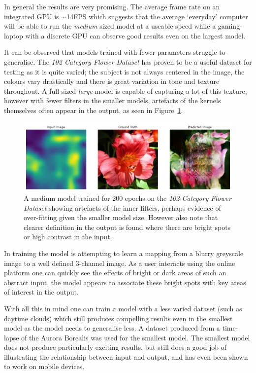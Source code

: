 \documentclass{article}
\begin{document}
In general the results are very promising. The average frame rate on an integrated GPU is $\sim$14FPS which suggests that the average `everyday' computer will be able to run the \textit{medium} sized model at a useable speed while a gaming-laptop with a discrete GPU can observe good results even on the largest model.

It can be observed that models trained with fewer parameters struggle to generalise. The \textit{102 Category Flower Dataset}\cite{flowers_dataset} has proven to be a useful dataset for testing as it is quite varied; the subject is not always centered in the image, the colours vary drastically and there is great variation in tone and texture throughout. A full sized \textit{large} model is capable of capturing a lot of this texture, however with fewer filters in the smaller models, artefacts of the kernels themselves often appear in the output, as seen in Figure~\ref{fig:kernelsInOutput}.

\begin{figure}[h!]
	\centering
	\includegraphics[scale=0.3]{artefacts}
	\caption{A medium model trained for 200 epochs on the \textit{102 Category Flower Dataset}\cite{flowers_dataset} showing artefacts of the inner filters, perhaps evidence of over-fitting given the smaller model size. However also note that clearer definition in the output is found where there are bright spots or high contrast in the input.\label{fig:kernelsInOutput}}
\end{figure}

In training the model is attempting to learn a mapping from a blurry greyscale image to a well defined 3-channel image. As a user interacts using the online platform one can quickly see the effects of bright or dark areas of such an abstract input, the model appears to associate these bright spots with key areas of interest in the output.

With all this in mind one can train a model with a less varied dataset (such as daytime clouds) which still produces compelling results even in the smallest model as the model needs to generalise less. A dataset produced from a time-lapse of the Aurora Borealis was used for the smallest model. The smallest model does not produce particularly exciting results, but still does a good job of illustrating the relationship between input and output, and has even been shown to work on mobile devices.
\end{document}
